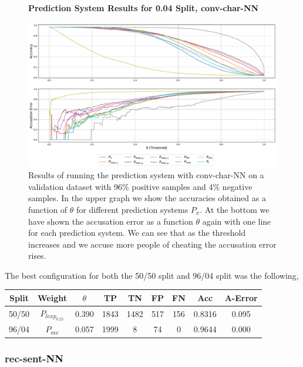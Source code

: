 \begin{figure}
    \centering
    \textbf{Prediction System Results for 0.04 Split, \gls{conv-char-NN}}\par\medskip
    \includegraphics[scale=0.33]{./pictures/experiments/conv_char_nn/prediction_system_04}
    \caption{Results of running the prediction system with \gls{conv-char-NN}
        on a validation dataset with 96\% positive samples and 4\% negative
        samples. In the upper graph we show the accuracies obtained as a
        function of $\theta$ for different prediction systems $P_x$. At the
        bottom we have shown the accusation error as a function $\theta$ again
        with one line for each prediction system. We can see that as the
        threshold increases and we accuse more people of cheating the accusation
        error rises.}
    \label{fig:conv-char-NN-pred-4}
\end{figure}

The best configuration for both the 50/50 split and 96/04 split was the
following,

\begin{center}
\begin{tabular}{|c|c|c|c|c|c|c|c|c|}
\hline
Split & Weight            & $\theta$ & TP  & TN  & FP & FN & Acc    & A-Error \\ \hline
50/50 & $P_{lexp_{0.25}}$ & 0.390    & 1843 & 1482 & 517 & 156 & 0.8316 & 0.095   \\ \hline
96/04 & $P_{mv}$          & 0.057    & 1999 & 8    & 74  & 0   & 0.9644 & 0.000   \\ \hline
\end{tabular}
\end{center}


\subsubsection{\glsdesc{rec-sent-NN}}
\label{subsubsec:rec_sent_nn}

